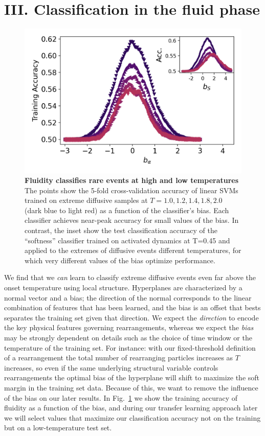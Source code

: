 \documentclass[aps,reprint,superscriptaddress,nofootinbib, notitlepage,prl]{revtex4-2}
\begin{document}
%
%
\section{III. Classification in the fluid phase}
%
%


\begin{figure}[ht]
    \centering
    \includegraphics[width =1.0\linewidth]{Figure_1.png}
    \caption{\textbf{Fluidity classifies rare events at high and low temperatures} The points show the 5-fold cross-validation accuracy  of linear SVMs trained on extreme diffusive samples at $T=1.0,1.2,1.4,1.8,2.0$ (dark blue to light red) as a function of the classifier's bias. Each classifier achieves near-peak accuracy for small values of the bias. In contrast, the inset show the test classification accuracy of the ``softness'' classifier trained on activated dynamics at T=0.45 and applied to the extremes of diffusive events different temperatures, for which very different values of the bias optimize performance.}
    \label{fig:classificationAccuracy}
\end{figure}


We find that we \emph{can} learn to classify extreme diffusive events even far above the onset temperature using local structure. Hyperplanes are characterized by a normal vector and a bias; the direction of the normal corresponds to the linear combination of features that has been learned, and the bias is an offset that bests separates the training set given that direction. We expect the \emph{direction} to encode the key physical features governing rearrangements, whereas we expect the \emph{bias} may be strongly dependent on details such as the choice of time window or the temperature of the training set. For instance: with our fixed-threshold definition of a rearrangement the total number of rearranging particles increases as $T$ increases, so even if the same underlying structural variable controls rearrangements the optimal bias of the hyperplane will shift to maximize the soft margin in the training set data. Because of this, we want to remove the influence of the bias on our later results. In Fig.~\ref{fig:classificationAccuracy} we show the training accuracy of fluidity as a function of the bias, and during our transfer learning approach later we will select values that maximize our classification accuracy not on the training but on a low-temperature test set. 
\end{document}
